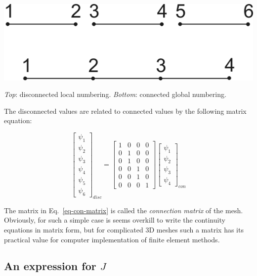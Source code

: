 \begin{marginfigure}
\centering
\includegraphics{numeric/figures/connect}
\caption{\emph{Top}: disconnected local numbering. \emph{Bottom}: connected global numbering.}
\label{fig-connect}
\end{marginfigure}

The disconnected values are related to connected values by the following matrix equation:

\begin{equation}
\begin{bmatrix}
\psi_1 \\ \psi_2 \\ \psi_3 \\ \psi_4 \\ \psi_5 \\ \psi_6
\end{bmatrix}_{disc}
=
\begin{bmatrix}
1 & 0 & 0 & 0  \\ 
0 & 1 & 0 & 0  \\   
0 & 1 & 0 & 0  \\ 
0 & 0 & 1 & 0  \\   
0 & 0 & 1 & 0  \\  
0 & 0 & 0 & 1  
\end{bmatrix}
\begin{bmatrix}
\psi_1 \\ \psi_2 \\ \psi_3 \\ \psi_4
\end{bmatrix}_{con}
\label{eq-con-matrix}
\end{equation} 

The matrix in Eq.~\ref{eq-con-matrix} is called the \emph{connection matrix} of the mesh. Obviously, for such a simple case is seems overkill to write the continuity equations in matrix form, but for complicated 3D meshes such a matrix has its practical value for computer implementation of finite element methods.

\subsection{An expression for $J$}

